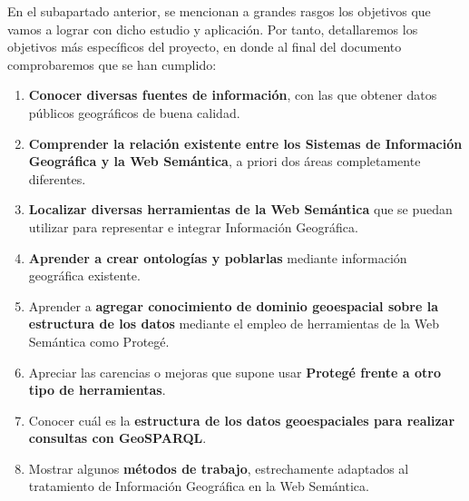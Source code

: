 

En el subapartado anterior, se mencionan a grandes rasgos los objetivos que vamos a lograr con dicho estudio y aplicación. Por tanto, detallaremos los objetivos más específicos del proyecto, en donde al final del documento comprobaremos que se han cumplido:

\begin{enumerate}
	
	\item \textbf{Conocer diversas fuentes de información}, con las que obtener datos públicos geográficos de buena calidad.
	
	\item \textbf{Comprender la relación existente entre los Sistemas de Información Geográfica y la Web Semántica}, a priori dos áreas completamente diferentes.
	
	\item \textbf{Localizar diversas herramientas de la Web Semántica} que se puedan utilizar para representar e integrar Información Geográfica.
	
	\item \textbf{Aprender a crear ontologías y poblarlas} mediante información geográfica existente.
		
	\item Aprender a \textbf{agregar conocimiento de dominio geoespacial sobre la estructura de los datos} mediante el empleo de herramientas de la Web Semántica como Protegé.
	
	\item Apreciar las carencias o mejoras que supone usar \textbf{Protegé frente a otro tipo de herramientas}.
	
	\item Conocer cuál es la \textbf{estructura de los datos geoespaciales para realizar consultas con GeoSPARQL}.
	
	\item Mostrar algunos \textbf{métodos de trabajo}, estrechamente adaptados al tratamiento de Información Geográfica en la Web Semántica.
	

\end{enumerate}
